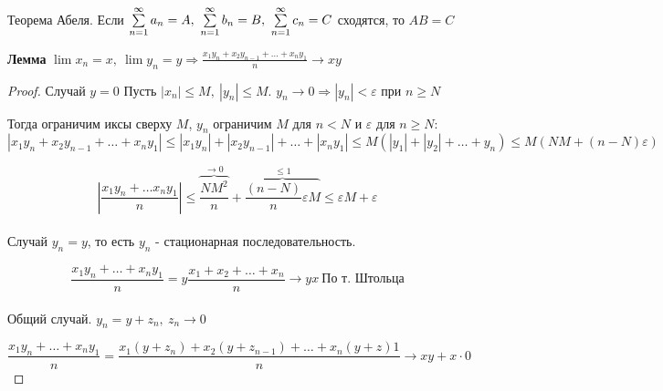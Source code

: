 \begin{theorem}
    Теорема Абеля. Если $\sum \limits_{n=1}^\infty a_n = A,\ \sum \limits_{n=1}^\infty b_n = B,\ \sum \limits_{n=1}^\infty c_n = C$ сходятся, то $AB = C$
\end{theorem}

\textbf{Лемма} $\lim x_n = x,\ \lim y_n = y \Rightarrow \frac{x_1 y_n + x_2y_{n-1} + \ldots + x_ny_1}{n} \to xy$

\begin{proof}
    Случай $y = 0$
    Пусть $|x_n| \leq M,\ |y_n| \leq M$. $y_n \to 0 \Rightarrow |y_n| < \varepsilon$ при $n \geq N$

    Тогда ограничим иксы сверху $M$, $y_n$ ограничим $M$ для $n < N$ и $\varepsilon$ для $n \geq N$:
    \begin{equation*}
    |x_1y_n + x_2y_{n-1} + \ldots + x_ny_1| \leq |x_1y_n| + |x_2y_{n-1}| + \ldots + |x_ny_1| \leq M(|y_1|+|y_2|+\ldots + y_n)
    \leq M(NM + (n-N)\varepsilon)
    \end{equation*}

    \begin{equation*}
        \left|\frac{x_1y_n+\ldots x_ny_1}{n}\right|
        \leq \overbrace{\frac{NM^2}{n}}^{\to 0} +  \overbrace{\frac{(n-N)}{n}\varepsilon M}^{\leq 1} 
        \leq \varepsilon M + \varepsilon
    \end{equation*}\\

    Случай $y_n = y$, то есть $y_n$ - стационарная последовательность.

    \[\frac{x_1y_n + \ldots + x_ny_1}{n} = y \frac{x_1+x_2+\ldots+x_n}{n} \to yx\ \text{По т. Штольца} \]\\

    Общий случай. $y_n = y+z_n,\ z_n \to 0$

    \[ \frac{x_1y_n + \ldots + x_ny_1}{n} = \frac{x_1(y+z_n) + x_2(y+z_{n-1}) + \ldots + x_n(y+z)1}{n} \to xy + x\cdot 0 \]
\end{proof}

